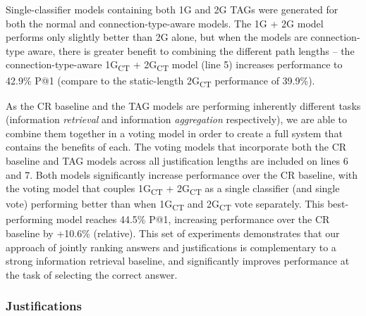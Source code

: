 {{} Single-classifier models containing both 1G and 2G TAGs were generated for both the normal and connection-type-aware models.  The 1G + 2G model performs only slightly better than 2G alone, but when the models are connection-type aware, there is greater benefit to combining the different path lengths -- the connection-type-aware 1G\textsubscript{CT} + 2G\textsubscript{CT} model (line 5) increases performance to 42.9\% P@1 (compare to the static-length 2G\textsubscript{CT} performance of 39.9\%).


As the CR baseline and the TAG models are performing inherently different tasks (information \emph{retrieval} and information \emph{aggregation} respectively), we are able to combine them together in a voting model in order to create a full system that contains the benefits of each.
The voting models that incorporate both the CR baseline and TAG models across all justification lengths are included on lines 6 and 7.  Both models significantly increase performance over the CR baseline, with the voting model that couples 1G\textsubscript{CT} + 2G\textsubscript{CT} as a single classifier (and single vote) performing better than when 1G\textsubscript{CT} and 2G\textsubscript{CT} vote separately.  This best-performing model reaches 44.5\% P@1, increasing performance over the CR baseline by +10.6\% (relative). %
This set of experiments demonstrates that our approach of jointly ranking answers and justifications is complementary to a strong information retrieval baseline, and significantly improves performance at the task of selecting the correct answer.  


\subsubsection{Justifications}


}
